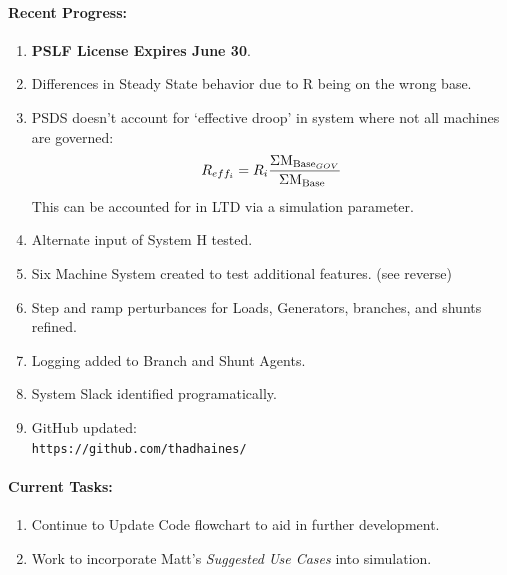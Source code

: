 \documentclass[12pt]{article}
\begin{document}
\begin{multicols}{2}
\raggedright
	\paragraph{Recent Progress:}
	\begin{enumerate}

		\item \textbf{PSLF License Expires June 30}.

		\item Differences in Steady State behavior due to R being on the wrong base.

		\item PSDS doesn't account for `effective droop' in system where not all machines are governed:
		\[R_{eff_i}=R_i \dfrac{\Sigma \text{M}_{\text{Base}_{GOV}} }{\Sigma \text{M}_{\text{Base}_{\ }}}  \]
		This can be accounted for in LTD via a simulation parameter.

		\item Alternate input of System H tested.
		
		\item Six Machine System created to test additional features. (see reverse)
		
		\item Step and ramp perturbances for Loads, Generators, branches, and shunts refined.
		\item Logging added to Branch and Shunt Agents.
		
		\item System Slack identified programatically.

		\item GitHub updated:\\
		\verb|https://github.com/thadhaines/|
		
	\end{enumerate}
\paragraph{Current Tasks:}
	\begin{enumerate}

		\item Continue to Update Code flowchart to aid in further development.

		\item Work to incorporate Matt's \emph{Suggested Use Cases} into simulation.
		\begin{itemize}
		

\end{itemize}
\end{enumerate}
\end{multicols}
\end{document}
